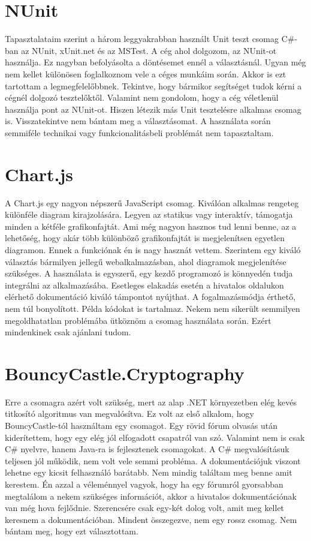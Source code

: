 \documentclass[12pt]{report} %
\begin{document}
\section{NUnit} %

Tapasztalataim szerint a három leggyakrabban használt Unit teszt csomag C\#-ban az NUnit, xUnit.net és az MSTest. A cég ahol dolgozom, az NUnit-ot \cite{nUnit} használja. Ez nagyban befolyásolta a döntésemet ennél a választásnál. Ugyan még nem kellet különösen foglalkoznom vele a céges munkáim során. Akkor is ezt tartottam a legmegfelelőbbnek. Tekintve, hogy bármikor segítséget tudok kérni a cégnél dolgozó tesztelőktől. Valamint nem gondolom, hogy a cég véletlenül használja pont az NUnit-ot. Hiszen létezik más Unit tesztelésre alkalmas csomag is. Visszatekintve nem bántam meg a választásomat. A használata során semmiféle technikai vagy funkcionalitásbeli problémát nem tapasztaltam.

\section{Chart.js} %

A Chart.js \cite{chartJs} egy nagyon népszerű JavaScript csomag. Kiválóan alkalmas rengeteg különféle diagram kirajzolására. Legyen az statikus vagy interaktív, támogatja minden a kétféle grafikonfajtát. Ami még nagyon hasznos tud lenni benne, az a lehetőség, hogy akár több különböző grafikonfajtát is megjelenítsen egyetlen diagramon. Ennek a funkciónak én is nagy hasznát vettem. Szerintem egy kiváló választás bármilyen jellegű webalkalmazásban, ahol diagramok megjelenítése szükséges. A használata is egyszerű, egy kezdő programozó is könnyedén tudja integrálni az alkalmazásába. Esetleges elakadás esetén a hivatalos oldalukon elérhető dokumentáció kiváló támpontot nyújthat. A fogalmazásmódja érthető, nem túl bonyolított. Példa kódokat is tartalmaz. Nekem nem sikerült semmilyen megoldhatatlan problémába ütköznöm a csomag használata során. Ezért mindenkinek csak ajánlani tudom.

\section{BouncyCastle.Cryptography} %

Erre a csomagra azért volt szükség, mert az alap .NET környezetben elég kevés titkosító algoritmus van megvalósítva. Ez volt az első alkalom, hogy BouncyCastle-tól \cite{bouncyCastle} használtam egy csomagot. Egy rövid fórum olvasás után kiderítettem, hogy egy elég jól elfogadott csapatról van szó. Valamint nem is csak C\# nyelvre, hanem Java-ra is fejlesztenek csomagokat. A C\# megvalósításuk teljesen jól működik, nem volt vele semmi probléma. A dokumentációjuk viszont lehetne egy kicsit felhasználó barátabb. Nem mindig találtam meg benne amit kerestem. Én azzal a véleménnyel vagyok, hogy ha egy fórumról gyorsabban megtalálom a nekem szükséges információt, akkor a hivatalos dokumentációnak van még hova fejlődnie. Szerencsére csak egy-két dolog volt, amit meg kellet keresnem a dokumentációban. Mindent összegezve, nem egy rossz csomag. Nem bántam meg, hogy ezt választottam.
\end{document}
